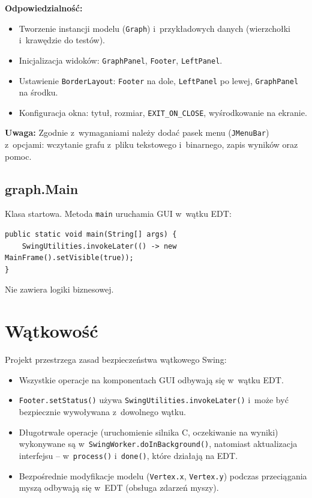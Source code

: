 \documentclass[12pt]{article}
\begin{document}
\textbf{Odpowiedzialność:}
\begin{itemize}
    \item Tworzenie instancji modelu (\texttt{Graph}) i~przykładowych danych
          (wierzchołki i~krawędzie do testów).
    \item Inicjalizacja widoków: \texttt{GraphPanel}, \texttt{Footer},
          \texttt{LeftPanel}.
    \item Ustawienie \texttt{BorderLayout}: \texttt{Footer} na dole,
          \texttt{LeftPanel} po lewej, \texttt{GraphPanel} na środku.
    \item Konfiguracja okna: tytuł, rozmiar, \texttt{EXIT\_ON\_CLOSE},
          wyśrodkowanie na ekranie.
\end{itemize}

\textbf{Uwaga:} Zgodnie z~wymaganiami należy dodać pasek menu
(\texttt{JMenuBar}) z~opcjami: wczytanie grafu z~pliku tekstowego i~binarnego,
zapis wyników oraz pomoc.

\subsection{graph.Main}

Klasa startowa. Metoda \texttt{main} uruchamia GUI w~wątku EDT:

\begin{lstlisting}
public static void main(String[] args) {
    SwingUtilities.invokeLater(() -> new MainFrame().setVisible(true));
}
\end{lstlisting}

Nie zawiera logiki biznesowej.

\section{Wątkowość}

Projekt przestrzega zasad bezpieczeństwa wątkowego Swing:

\begin{itemize}
    \item Wszystkie operacje na komponentach GUI odbywają się w~wątku EDT.
    \item \texttt{Footer.setStatus()} używa \texttt{SwingUtilities.invokeLater()}
          i~może być bezpiecznie wywoływana z~dowolnego wątku.
    \item Długotrwałe operacje (uruchomienie silnika C, oczekiwanie na wyniki)
          wykonywane są w~\texttt{SwingWorker.doInBackground()}, natomiast
          aktualizacja interfejsu -- w~\texttt{process()} i~\texttt{done()},
          które działają na EDT.
    \item Bezpośrednie modyfikacje modelu (\texttt{Vertex.x}, \texttt{Vertex.y})
          podczas przeciągania myszą odbywają się w~EDT (obsługa zdarzeń myszy).
\end{itemize}
\end{document}
